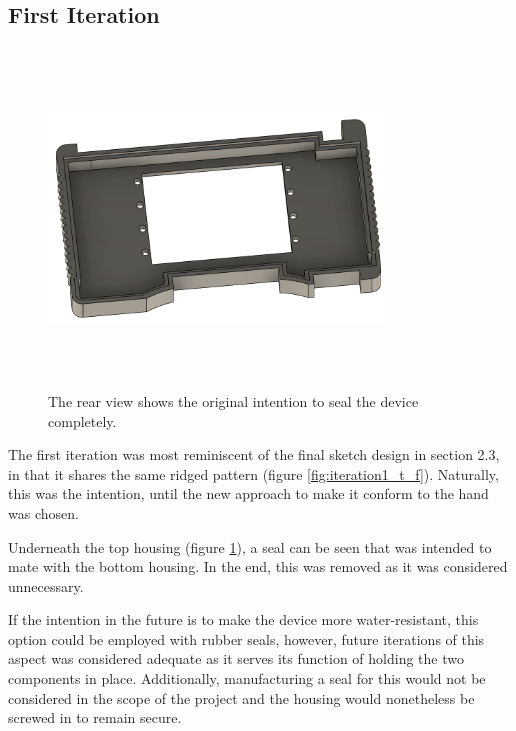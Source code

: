 \subsection{First Iteration}

\begin{figure} [h]
    \centering
    \includegraphics[width=9cm,height=9cm,keepaspectratio]{Figures/iteration1_top_back.png}
    \caption{The rear view shows the original intention to seal the device completely.}
    \label{fig:iteration1_t_b}
\end{figure}

The first iteration was most reminiscent of the final sketch design in section 2.3, in that it shares the same ridged pattern (figure \ref{fig:iteration1_t_f}).
Naturally, this was the intention, until the new approach to make it conform to the hand was chosen.

Underneath the top housing (figure \ref{fig:iteration1_t_b}), a seal can be seen that was intended to mate with the bottom housing.
In the end, this was removed as it was considered unnecessary.

If the intention in the future is to make the device more water-resistant, this option could be employed with rubber seals, however, future iterations of this aspect was considered adequate as it serves its function of holding the two components in place.
Additionally, manufacturing a seal for this would not be considered in the scope of the project and the housing would nonetheless be screwed in to remain secure.

